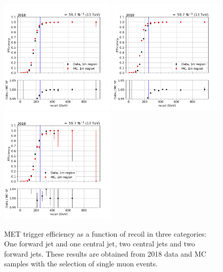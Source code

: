 \begin{figure}[hbp]
    \begin{center}
        \includegraphics[width=0.49\textwidth]{fig/efficiency/trigger/met/recoil/data_mc_comparison_1m_2018_one_jet_forward_one_jet_central.png}
        \includegraphics[width=0.49\textwidth]{fig/efficiency/trigger/met/recoil/data_mc_comparison_1m_2018_two_central_jets.png} \\
        \includegraphics[width=0.49\textwidth]{fig/efficiency/trigger/met/recoil/data_mc_comparison_1m_2018_two_forward_jets.png}
    \end{center}
    \caption{MET trigger efficiency as a function of recoil in three categories: One forward jet and one central jet, two central jets and
            two forward jets. These results are obtained from 2018 data and MC samples with the selection of single muon events.}
    \label{fig:eff_recoil_2018_1m}
\end{figure}
